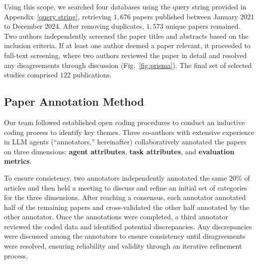 Using this scope, we searched four databases using the query string provided in Appendix~\ref{query string}, retrieving $1,676$ papers published between January 2021 to December 2024. After removing duplicates, $1,573$ unique papers remained. Two authors independently screened the paper titles and abstracts based on the inclusion criteria. If at least one author deemed a paper relevant, it proceeded to full-text screening, where two authors reviewed the paper in detail and resolved any disagreements through discussion (Fig.~\ref{fig:prisma}). The final set of selected studies comprised $122$ publications.


\subsection{Paper Annotation Method}
Our team followed established open coding procedures \cite{brod2009qualitative} to conduct an inductive coding process to identify key themes. Three co-authors with extensive experience in LLM agents (``annotators,'' hereinafter) collaboratively annotated the papers on three dimensions: \textbf{agent attributes}, \textbf{task attributes}, and \textbf{evaluation metrics}. 

To ensure consistency, two annotators independently annotated the same 20\% of articles and then held a meeting to discuss and refine an initial set of categories for the three dimensions. After reaching a consensus, each annotator annotated half of the remaining papers and cross-validated the other half annotated by the other annotator. Once the annotations were completed, a third annotator reviewed the coded data and identified potential discrepancies. 
Any discrepancies were discussed among the annotators to ensure consistency until disagreements were resolved, ensuring reliability and validity through an iterative refinement process.
